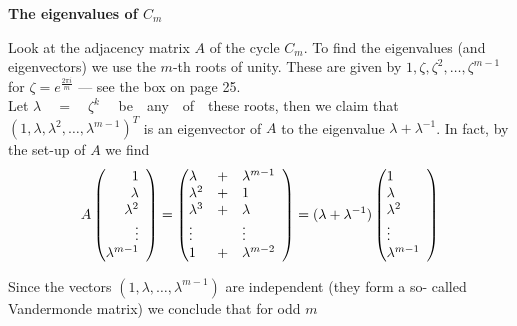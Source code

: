 \documentclass[openany,12pt]{memoir}
\begin{document}
\begin{mdframed}[nobreak=true,backgroundcolor=gray!15]
\vspace{8pt}
{\Large\textbf{The eigenvalues of $C_m$}}
\vspace{5pt}

Look at the adjacency matrix $A$ of the cycle $C_m$. To find the eigenvalues 
(and eigenvectors) we use the $m$-th roots of unity. These are 
given by $1, \zeta, \zeta^2, \ldots, \zeta^{m-1}$ for $\zeta = e^{\frac{2\pi i}{m}}$ --- see the box on page 25.\\ 
Let $\lambda \quad=\quad\zeta ^k$ \ \ be\ \  any\ \  of\ \  these roots, then we claim that
$(1, \lambda, \lambda^2, \ldots, \lambda^{m-1})^T$ is an eigenvector of $A$ to the eigenvalue $\lambda + \lambda^{-1}$.
In fact, by the set-up of $A$ we find\\

\[
A \begin{pmatrix}
    \begin{array}{@{}*{5}{r}@{}}
    1 \\
    \lambda \\
    \lambda^2 \\
    \vdots \\
    \lambda^{m-1}
    \end{array}
\end{pmatrix}
=
\begin{pmatrix}
    \begin{array}{@{}*{5}{l}@{}}
    \lambda & + & \lambda^{m-1} \\
    \lambda^2 & + & 1 \\
    \lambda^3 & + & \lambda \\
    \vdots & & \vdots \\
    1 & + & \lambda^{m-2}
    \end{array}
\end{pmatrix}
=
(\lambda + \lambda^{-1})
\begin{pmatrix}
    \begin{array}{@{}*{5}{l}@{}}
    1 \\
    \lambda \\
    \lambda^2 \\
    \vdots \\
    \lambda^{m-1}
    \end{array}
\end{pmatrix}
\]

Since the vectors $(1, \lambda, \ldots, \lambda^{m-1})$ are independent (they form a so-
called Vandermonde matrix) we conclude that for odd $m$


\end{mdframed}
\end{document}
